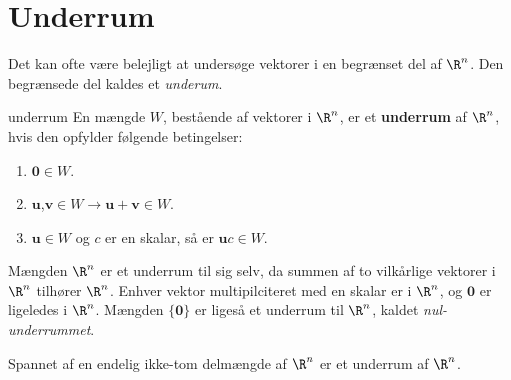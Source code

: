 \section{Underrum}
Det kan ofte være belejligt at undersøge vektorer i en begrænset del af $\R^n$. Den begrænsede del kaldes et \textit{underum}.
%
\begin{defn}{}{underrum}
En mængde $W$, bestående af vektorer i $\R^n$, er et \textbf{underrum} af $\R^n$, hvis den opfylder følgende betingelser:	
\begin{enumerate}[label=(\alph*)]
	\item $\textbf{0}\in W$.
	\item $\textbf{u}$,$\textbf{v} \in W \rightarrow \textbf{u}+\textbf{v} \in W $.
	\item $\textbf{u} \in W$ og $c$ er en skalar, så er $\textbf{u}c \in W$.
\end{enumerate}
\end{defn}
\noindent
Mængden $\R^n$ er et underrum til sig selv, da summen af to vilkårlige vektorer i $\R^n$ tilhører $\R^n$.
Enhver vektor multipilciteret med en skalar er i $\R^n$, og $\textbf{0}$ er ligeledes i $\R^n$. 
Mængden $\{\textbf{0}\}$ er ligeså et underrum til $\R^n$, kaldet \textit{nul-underrummet}.
%
%
\begin{thm}{}{}
Spannet af en endelig ikke-tom delmængde af $\R^n$ er et underrum af $\R^n$.
\end{thm}
